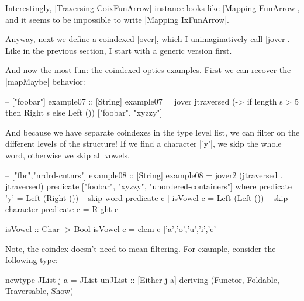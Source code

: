 Interestingly, |Traversing CoixFunArrow| instance looks like
|Mapping FunArrow|, and it seems to be impossible to write |Mapping IxFunArrow|.

Anyway, next we define a coindexed |over|, which I unimaginatively call |jover|.
Like in the previous section, I start with a generic version first.


And now the most fun: the coindexed optics examples.
First we can recover the |mapMaybe| behavior:

\begin{code}
-- ["foobar"]
example07 :: [String]
example07 = jover jtraversed
    (\s -> if length s > 5 then Right s else Left ())
    ["foobar", "xyzzy"]
\end{code}

And because we have separate coindexes in the type level list,
we can filter on the different levels of the structure!
If we find a character |'y'|, we skip the whole
word, otherwise we skip all vowels.

\begin{code}
-- ["fbr","nrdrd-cntnrs"]
example08 :: [String]
example08 = jover2 (jtraversed . jtraversed)
    predicate
    ["foobar", "xyzzy", "unordered-containers"]
  where
    predicate 'y'           = Left (Right ())  -- skip word
    predicate c | isVowel c = Left (Left ())   -- skip character
    predicate c             = Right c

isVowel :: Char -> Bool
isVowel c = elem c ['a','o','u','i','e']
\end{code}

Note, the coindex doesn't need to mean filtering.
For example, consider the following type:

\begin{code}
newtype JList j a = JList { unJList :: [Either j a] }
  deriving (Functor, Foldable, Traversable, Show)
\end{code}

